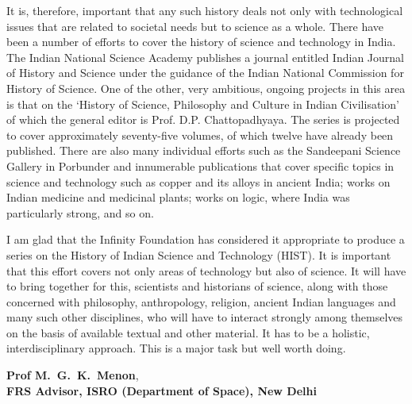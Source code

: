 It is, therefore, important that any such history deals not only with technological issues that are related to societal needs but to science as a whole.
There have been a number of efforts to cover the history of science and technology in India. The Indian National Science Academy publishes a journal entitled Indian Journal of History and Science under the guidance of the Indian National Commission for History of Science. One of the other, very ambitious, ongoing projects in this area is that on the ‘History of Science, Philosophy and Culture in Indian Civilisation’ of which the general editor is Prof. D.P. Chattopadhyaya. The series is projected to cover approximately seventy-five volumes, of which twelve have already been published. There are also many individual efforts such as the Sandeepani Science Gallery in Porbunder and innumerable publications that cover specific topics in science and technology such as copper and its alloys in ancient India; works on Indian medicine and medicinal plants; works on logic, where India was particularly strong, and so on.

I am glad that the Infinity Foundation has considered it appropriate to produce a series on the History of Indian Science and Technology (HIST). It is important that this effort covers not only areas of technology but also of science. It will have to bring together for this, scientists and historians of science, along with those concerned with philosophy, anthropology, religion, ancient Indian languages and many such other disciplines, who will have to interact strongly among themselves on the basis of available textual and other material. It has to be a holistic, interdisciplinary approach. This is a major task but well worth doing.

\begin{flushright}
\textbf{Prof M.~G.~K.~Menon},\\
\textbf{FRS Advisor, ISRO (Department of Space), New Delhi}
\end{flushright}



\label{endpreface2}
